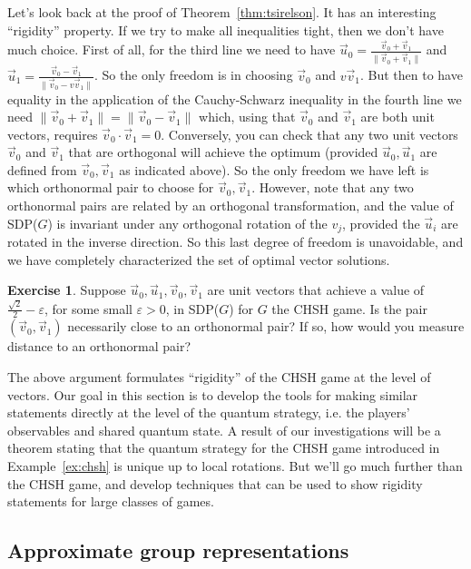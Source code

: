 \documentclass{report}
\theoremstyle{plain}
\theoremstyle{definition}
\newtheorem{exercise}[subsection]{Exercise}
\theoremstyle{remark}
\newcommand{\eps}{\varepsilon}
\numberwithin{equation}{subsection}
\begin{document}
Let's look back at the proof of Theorem~\ref{thm:tsirelson}. It has an interesting ``rigidity'' property. If we try to make all inequalities tight, then we don't have much choice. First of all, for the third line we need to have $\vec{u}_0 = \frac{\vec{v}_0+\vec{v}_1}{\|\vec{v}_0+\vec{v}_1\|}$ and $\vec{u}_1 = \frac{\vec{v}_0-\vec{v}_1}{\|\vec{v}_0-v\vec{v}_1\|}$. So the only freedom is in choosing $\vec{v}_0$ and $v\vec{v}_1$. But then to have equality in the application of the Cauchy-Schwarz inequality in the fourth line we need $\|\vec{v}_0+\vec{v}_1\|=\|\vec{v}_0-\vec{v}_1\|$ which, using that $\vec{v}_0$ and $\vec{v}_1$ are both unit vectors, requires $\vec{v}_0 \cdot \vec{v}_1 = 0$. Conversely, you can check that any two unit vectors $\vec{v}_0$ and $\vec{v}_1$ that are orthogonal will achieve the optimum (provided $\vec{u}_0,\vec{u}_1$ are defined from $\vec{v}_0,\vec{v}_1$ as indicated above). So the only freedom we have left is which orthonormal pair to choose for $\vec{v}_0,\vec{v}_1$. However, note that any two orthonormal pairs are related by an orthogonal transformation, and the value of SDP($G$) is invariant under any orthogonal rotation of the $v_j$, provided the $\vec{u}_i$ are rotated in the inverse direction. So this last degree of freedom is unavoidable, and we have completely characterized the set of optimal vector solutions. 

\begin{exercise}
Suppose $\vec{u}_0,\vec{u}_1,\vec{v}_0,\vec{v}_1$ are unit vectors that achieve a value of $\frac{\sqrt{2}}{2}-\eps$, for some small $\eps>0$, in SDP($G$) for $G$ the CHSH game. Is the pair $(\vec{v}_0,\vec{v}_1)$ necessarily close to an orthonormal pair? If so, how would you measure distance to an orthonormal pair?  
\end{exercise}

The above argument formulates ``rigidity'' of the CHSH game at the level of vectors. Our goal in this section is to develop the tools for making similar statements directly at the level of the quantum strategy, i.e. the players' observables and shared quantum state. A result of our investigations will be a theorem stating that the quantum strategy for the CHSH game introduced in Example~\ref{ex:chsh} is  unique up to local rotations. But we'll go much further than the CHSH game, and develop techniques that can be used to show rigidity statements for large classes of games. 


\subsection{Approximate group representations}
\label{section:approx-group}
\end{document}
